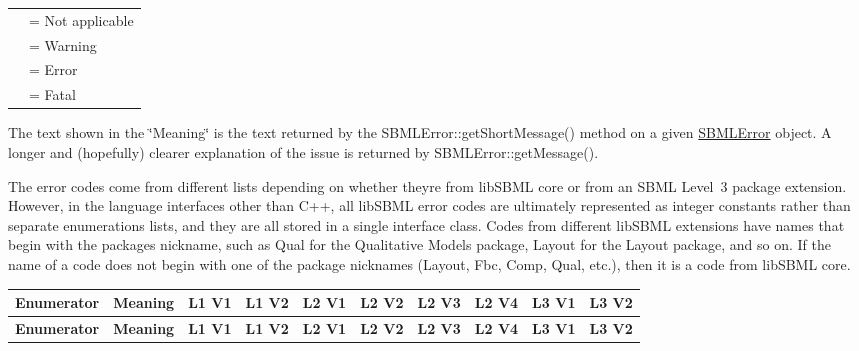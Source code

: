 \tabulinesep=1mm
\begin{longtabu} spread 0pt [c]{*{2}{|X[-1]}|}
\hline
&= Not applicable \\
&= Warning \\
&= Error \\
&= Fatal \\
\end{longtabu}


The text shown in the \char`\"{}\+Meaning\char`\"{} is the text returned by the S\+B\+M\+L\+Error\+::get\+Short\+Message() method on a given \hyperlink{class_s_b_m_l_error}{S\+B\+M\+L\+Error} object. A longer and (hopefully) clearer explanation of the issue is returned by S\+B\+M\+L\+Error\+::get\+Message().

The error codes come from different lists depending on whether they\textquotesingle{}re from lib\+S\+B\+ML core or from an S\+B\+ML Level~3 package extension. However, in the language interfaces other than C++, all lib\+S\+B\+ML error codes are ultimately represented as integer constants rather than separate enumerations lists, and they are all stored in a single interface class. Codes from different lib\+S\+B\+ML extensions have names that begin with the package\textquotesingle{}s nickname, such as {\ttfamily Qual} for the Qualitative Models package, {\ttfamily Layout} for the Layout package, and so on. If the name of a code does not begin with one of the package nicknames ({\ttfamily Layout}, {\ttfamily Fbc}, {\ttfamily Comp}, {\ttfamily Qual}, etc.), then it is a code from lib\+S\+B\+ML core. \begin{DoxyParagraph}{}
\tabulinesep=1mm
\begin{longtabu} spread 0pt [c]{*{10}{|X[-1]}|}
\hline
\rowcolor{\tableheadbgcolor}\textbf{ {\bfseries Enumerator} }&\textbf{ {\bfseries Meaning} }&\PBS\centering \textbf{ L1 V1 }&\PBS\centering \textbf{ L1 V2 }&\PBS\centering \textbf{ L2 V1 }&\PBS\centering \textbf{ L2 V2 }&\PBS\centering \textbf{ L2 V3 }&\PBS\centering \textbf{ L2 V4 }&\PBS\centering \textbf{ L3 V1 }&\PBS\centering \textbf{ L3 V2  }\\
\endfirsthead
\hline
\endfoot
\hline
\rowcolor{\tableheadbgcolor}\textbf{ {\bfseries Enumerator} }&\textbf{ {\bfseries Meaning} }&\PBS\centering \textbf{ L1 V1 }&\PBS\centering \textbf{ L1 V2 }&\PBS\centering \textbf{ L2 V1 }&\PBS\centering \textbf{ L2 V2 }&\PBS\centering \textbf{ L2 V3 }&\PBS\centering \textbf{ L2 V4 }&\PBS\centering \textbf{ L3 V1 }&\PBS\centering \textbf{ L3 V2  }\\

\end{longtabu}
\end{DoxyParagraph}
